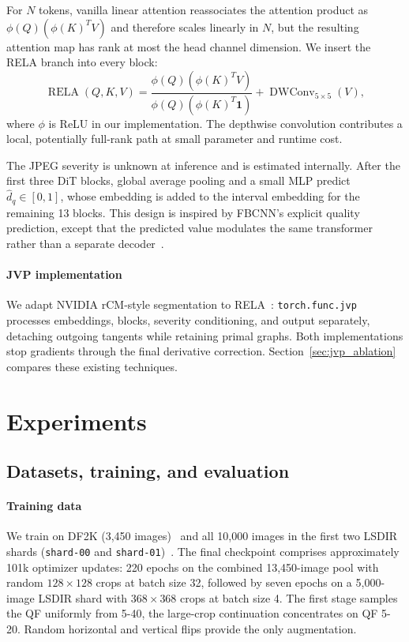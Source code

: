 \documentclass[conference,letterpaper]{IEEEtran}
\begin{document}
For $N$ tokens, vanilla linear attention reassociates the attention product as $\phi(Q)(\phi(K)^{T}V)$ and therefore scales linearly in $N$, but the resulting attention map has rank at most the head channel dimension.  We insert the RELA branch into every block:
\begin{equation}
\operatorname{RELA}(Q,K,V)=
\frac{\phi(Q)(\phi(K)^TV)}{\phi(Q)(\phi(K)^T\mathbf{1})}
+\operatorname{DWConv}_{5\times5}(V),
\end{equation}
where $\phi$ is ReLU in our implementation.  The depthwise convolution contributes a local, potentially full-rank path at small parameter and runtime cost.

The JPEG severity is unknown at inference and is estimated internally.  After the first three DiT blocks, global average pooling and a small MLP predict $\hat d_q\in[0,1]$, whose embedding is added to the interval embedding for the remaining 13 blocks.  This design is inspired by FBCNN's explicit quality prediction, except that the predicted value modulates the same transformer rather than a separate decoder~\cite{jiang2021fbcnn}.

\paragraph{JVP implementation}
We adapt NVIDIA rCM-style segmentation to RELA~\cite{rcm2025code}: \texttt{torch.func.jvp} processes embeddings, blocks, severity conditioning, and output separately, detaching outgoing tangents while retaining primal graphs. Both implementations stop gradients through the final derivative correction. Section~\ref{sec:jvp_ablation} compares these existing techniques.

\section{Experiments}
\label{sec:experiments}

\subsection{Datasets, training, and evaluation}

\paragraph{Training data}
We train on DF2K (3,450 images)~\cite{agustsson2017div2k} and all 10,000 images in the first two LSDIR shards (\texttt{shard-00} and \texttt{shard-01})~\cite{li2023lsdir}.  The final checkpoint comprises approximately 101k optimizer updates: 220 epochs on the combined 13,450-image pool with random $128\times128$ crops at batch size 32, followed by seven epochs on a 5,000-image LSDIR shard with $368\times368$ crops at batch size 4.  The first stage samples the QF uniformly from 5-40, the large-crop continuation concentrates on QF 5-20.  Random horizontal and vertical flips provide the only augmentation.
\end{document}
